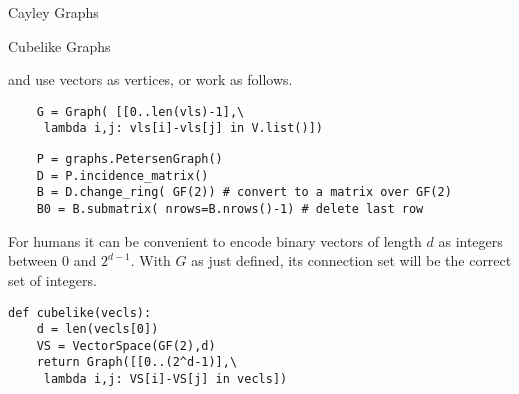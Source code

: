 \begin{chap}{Cayley Graphs}
\begin{sect}{Cubelike Graphs}
%
\begin{para}
and use vectors as vertices, or work as follows.
\end{para}
%
\begin{verbatim}
    G = Graph( [[0..len(vls)-1],\
     lambda i,j: vls[i]-vls[j] in V.list()])
\end{verbatim}
%
\begin{verbatim}
    P = graphs.PetersenGraph()
    D = P.incidence_matrix()
    B = D.change_ring( GF(2)) # convert to a matrix over GF(2)
    B0 = B.submatrix( nrows=B.nrows()-1) # delete last row
\end{verbatim}
%
\begin{para}
For humans it can be convenient to encode binary vectors of length $d$ as 
integers between 0 and $2^{d-1}$. With $G$ as just defined, its connection
set will be the correct set of integers.
\end{para}
%
\begin{verbatim}
def cubelike(vecls):
    d = len(vecls[0])
    VS = VectorSpace(GF(2),d)
    return Graph([[0..(2^d-1)],\
     lambda i,j: VS[i]-VS[j] in vecls])
\end{verbatim}
%
\end{sect}
%
\end{chap}